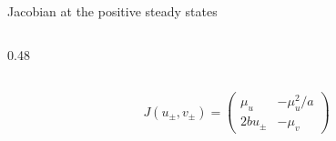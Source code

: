 \begin{frame}{Jacobian at the positive steady states}
\begin{columns}[T,onlytextwidth]
\begin{column}{0.48\textwidth}
    \end{column}

  \end{columns}

  \vspace{-0.34cm}

  {\color{HydraGold}\bfseries\fontsize{10.8}{13.7}\selectfont
  \begin{align*}
    \boxed{
      J(u_\pm,v_\pm)
      =
      \begin{pmatrix}
        \mu_u&-\mu_u^2/a
        \\
        2bu_\pm&-\mu_v
      \end{pmatrix}
    }
  \end{align*}
  }

  \vspace{-0.36cm}


\end{frame}


